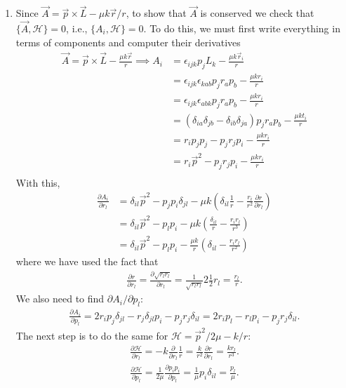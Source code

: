 \documentclass{article}
\theoremstyle{definition}
\newcommand{\p}{\partial}
\newcommand{\ham}{\mathcal{H}}
\newcommand{\f}[2]{\frac{#1}{#2}}
\newcommand{\lp}{\left(}
\newcommand{\rp}{\right)}
\begin{document}
\begin{enumerate}[label=(\alph*)]
	\item Since $\vec{A} = \vec{p}\times \vec{L} - \mu k\vec{r} /r$, to show that $\vec{A}$ is conserved we check that $\{ \vec{A} , \ham\} = 0$, i.e., $\{ A_i,\ham \} = 0$. To do this, we must first write everything in terms of components and computer their derivatives
	\begin{align*}
	\vec{A} = \vec{p}\times \vec{L} - \f{\mu k \vec{r}}{r} \implies A_i &=  \epsilon_{ijk}p_jL_k - \f{\mu k \vec{r}_i}{r}\\
	&= \epsilon_{ijk}\epsilon_{kab} p_jr_ap_b - \f{\mu k r_i}{r} \\ 
	&= \epsilon_{ijk}\epsilon_{abk} p_jr_ap_b - \f{\mu k r_i}{r} \\ 
	&= (\delta_{ia}\delta_{jb} - \delta_{ib}\delta_{ja})p_jr_a p_b - \f{\mu k t_i}{r} \\ 
	&= r_i p_jp_j  - p_j r_j p_i - \f{\mu k r_i}{r} \\
	&= r_i \vec{p}^2  - p_j r_j p_i - \f{\mu k r_i}{r} \\
	\end{align*}
	With this, 
	\begin{align*}
	\f{\p A_i}{\p r_l} &= \delta_{il}\vec{p}^2  - p_jp_i \delta_{jl} - \mu k \lp \delta_{il}\f{1}{r} - \f{r_i}{r^2}\f{\p r}{\p r_l} \rp\\ 
	&= \delta_{il} \vec{p}^2  - p_l p_i - \mu k \lp \f{\delta_{il}}{r} - \f{r_ir_l}{r^3} \rp \\
	&= \delta_{il} \vec{p}^2 - p_l p_i - \f{\mu k}{r} \lp \delta_{il} - \f{r_ir_l}{r^2} \rp 
	\end{align*}
	where we have used the fact that
	\begin{align*}
	\f{\p r}{\p r_l} = \f{\p \sqrt{r_l r_l}}{\p r_l} = \f{1}{\sqrt{r_lr_l}}2\f{1}{2}r_l = \f{r_l}{r}.
	\end{align*}
	We also need to find $\p A_i/\p p_l$:
	\begin{align*}
	\f{\p A_i}{\p p_l} = 2r_i p_j \delta_{jl} - r_j\delta_{jl}p_i- p_j r_j \delta_{il} = 2 r_i p_l - r_lp_i - p_j r_j \delta_{il}.
	\end{align*}
	The next step is to do the same for $\ham = \vec{p}^2/2\mu - k/r $:
	\begin{align*}
	\f{\p \ham}{\p r_l} = -k\f{\p}{\p r_l}\f{1}{r} = \f{k}{r^2}\f{\p r}{\p r_l} = \f{kr_l}{r^3}.
	\end{align*}
	\begin{align*}
	\f{\p \ham}{\p p_l} = \f{1}{2\mu} \f{\p p_i p_i}{\p p_l} = \f{1}{\mu} p_i \delta_{il} = \f{p_l}{\mu}.
	\end{align*}

\end{enumerate}
\end{document}
